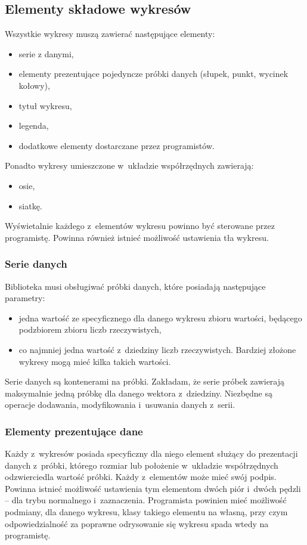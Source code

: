 \subsection{Elementy składowe wykresów}
Wszystkie wykresy muszą zawierać następujące elementy:
\begin{itemize}
\item{serie z danymi,}
\item{elementy prezentujące pojedyncze próbki danych (słupek, punkt, wycinek kołowy),}
\item{tytuł wykresu,}
\item{legenda,}
\item{dodatkowe elementy dostarczane przez programistów.}
\end{itemize}

Ponadto wykresy umieszczone w~układzie współrzędnych zawierają:
\begin{itemize}
\item{osie,} %
\item{siatkę.}
\end{itemize}

Wyświetalnie każdego z~elementów wykresu powinno być sterowane przez programistę. Powinna również istnieć możliwość ustawienia tła wykresu.

\subsubsection{Serie danych}
Biblioteka musi obsługiwać próbki danych, które posiadają następujące parametry:
\begin{itemize}
\item{jedna wartość ze specyficznego dla danego wykresu zbioru wartości, będącego podzbiorem zbioru liczb rzeczywistych,}
\item{co najmniej jedna wartość z~dziedziny liczb rzeczywistych. Bardziej złożone wykresy mogą mieć kilka takich wartości.}
\end{itemize}

Serie danych są kontenerami na próbki. Zakładam, że serie próbek zawierają maksymalnie jedną próbkę dla danego wektora z~dziedziny. Niezbędne są operacje dodawania, modyfikowania i~usuwania danych z~serii.
 
\subsubsection{Elementy prezentujące dane}
Każdy z~wykresów posiada specyficzny dla niego element służący do prezentacji danych z~próbki, którego rozmiar lub położenie w~układzie współrzędnych odzwierciedla wartość próbki. Każdy z~elementów może mieć swój podpis. Powinna istnieć możliwość ustawienia tym elementom dwóch piór i~dwóch pędzli -- dla trybu normalnego i~zaznaczenia. Programista powinien mieć możliwość podmiany, dla danego wykresu, klasy takiego elementu na własną, przy czym odpowiedzialność za poprawne odrysowanie się wykresu spada wtedy na programistę.

